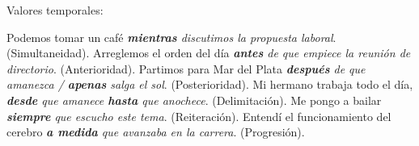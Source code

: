 \begin{exe}
  \ex\label{ex:13-temp} Valores temporales:
    \begin{xlist}
      \ex Podemos tomar un café \textit{\textbf{mientras} discutimos la propuesta
          laboral}. (Simultaneidad).
      \ex Arreglemos el orden del día \textit{\textbf{antes} de que empiece la
          reunión de directorio}. (Anterioridad).
      \ex Partimos para Mar del Plata \textit{\textbf{después} de que amanezca /
          \textbf{apenas} salga el sol}. (Posterioridad).
      \ex Mi hermano trabaja todo el día, \textit{\textbf{desde} que amanece
          \textbf{hasta} que anochece}. (Delimitación).
      \ex Me pongo a bailar \textit{\textbf{siempre} que escucho este tema}.
          (Reiteración).
      \ex Entendí el funcionamiento del cerebro \textit{\textbf{a medida} que
          avanzaba en la carrera}. (Progresión).
    \end{xlist}
\end{exe}

